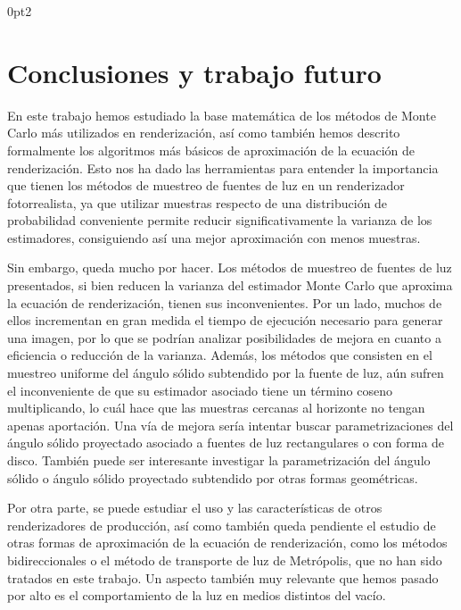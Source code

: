 \titlespacing*{\subsection}
  {0pt}{2\baselineskip}{\baselineskip}

  \chapter{Conclusiones y trabajo futuro}

  
  En este trabajo hemos estudiado la base matemática de los métodos de Monte Carlo más utilizados en renderización, así como también hemos descrito formalmente los algoritmos más básicos de aproximación de la ecuación de renderización. Esto nos ha dado las herramientas para entender la importancia que tienen los métodos de muestreo de fuentes de luz en un renderizador fotorrealista, ya que utilizar muestras respecto de una distribución de probabilidad conveniente permite reducir significativamente la varianza de los estimadores, consiguiendo así una mejor aproximación con menos muestras.

  Sin embargo, queda mucho por hacer. Los métodos de muestreo de fuentes de luz presentados, si bien reducen la varianza del estimador Monte Carlo que aproxima la ecuación de renderización, tienen sus inconvenientes. Por un lado, muchos de ellos incrementan en gran medida el tiempo de ejecución necesario para generar una imagen, por lo que se podrían analizar posibilidades de mejora en cuanto a eficiencia o reducción de la varianza. Además, los métodos que consisten en el muestreo uniforme del ángulo sólido subtendido por la fuente de luz, aún sufren el inconveniente de que su estimador asociado tiene un término coseno multiplicando, lo cuál hace que las muestras cercanas al horizonte no tengan apenas aportación. Una vía de mejora sería intentar buscar parametrizaciones del ángulo sólido proyectado asociado a fuentes de luz rectangulares o con forma de disco. También puede ser interesante investigar la parametrización del ángulo sólido o ángulo sólido proyectado subtendido por otras formas geométricas.

  Por otra parte, se puede estudiar el uso y las características de otros renderizadores de producción, así como también queda pendiente el estudio de otras formas de aproximación de la ecuación de renderización, como los métodos bidireccionales o el método de transporte de luz de Metrópolis, que no han sido tratados en este trabajo. Un aspecto también muy relevante que hemos pasado por alto es el comportamiento de la luz en medios distintos del vacío.
